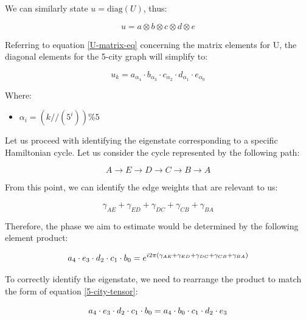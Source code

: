\documentclass[msc,oneside]{ubcthesis}
\begin{document}
	
	We can similarly state $ u = \mathrm{diag}(U)$, thus:
	
	$$ u = a \otimes b \otimes c \otimes d \otimes e$$
	
	
	Referring to equation \ref{U-matrix-eq} concerning the matrix elements for U,  the diagonal elements for the 5-city graph will simplify to:
	
	\begin{equation}\label{5-city-tensor}
		u_{k} = a_{\alpha_{4}}\cdot b _{\alpha_{3}} \cdot c_{\alpha_2} \cdot d_{\alpha_{1}}\cdot e_{\alpha_{0}}
	\end{equation}
	
	Where:
	\begin{itemize}
		\item[] $\alpha_i = \left(k//\left(5^{i}\right)\right) \% 5$
	\end{itemize}
	
	
	\vspace{0.5cm}
	
	Let us proceed with identifying the eigenstate corresponding to a specific Hamiltonian cycle. Let us consider the cycle represented by the following path:
	
	\begin{equation}\label{one-ham-cycle-5-city}
		A \rightarrow E \rightarrow D \rightarrow C \rightarrow B \rightarrow A
	\end{equation}
	
	From this point, we can identify the edge weights that are relevant to us:
	
	\begin{equation*}
		\gamma_{AE} + \gamma_{ED} + \gamma_{DC} + \gamma_{CB} + \gamma_{BA}
	\end{equation*}
	
	Therefore, the phase we aim to estimate would be determined by the following element product:
	
	\begin{equation*}
		\Large{a_{4} \cdot e_{3} \cdot d_{2} \cdot c_{1} \cdot b_{0} = e^{i2\pi (\gamma_{AE} + \gamma_{ED} + \gamma_{DC} + \gamma_{CB} + \gamma_{BA})}}
	\end{equation*}
	
	
	To correctly identify the eigenstate, we need to rearrange the product to match the form of equation \ref{5-city-tensor}:
	
	\begin{equation*}
		\Large{a_{4} \cdot e_{3} \cdot d_{2} \cdot c_{1} \cdot b_{0}= a_{4} \cdot b_{0}  \cdot c_{1}\cdot d_{2} \cdot e_{3}}
	\end{equation*}
	
\end{document}
